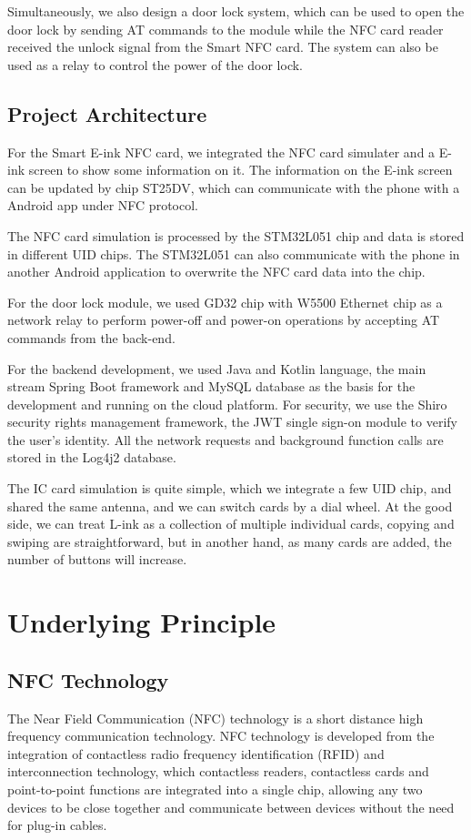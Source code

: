 \documentclass[11pt, a4paper]{article}
\begin{document}
Simultaneously, we also design a door lock system, which can be used to open the door lock by sending AT commands to the module while the NFC card reader received the unlock signal from the Smart NFC card.
The system can also be used as a relay to control the power of the door lock.

\subsection{Project Architecture}

For the Smart E-ink NFC card, we integrated the NFC card simulater and a E-ink screen to show some information on it. The information on the E-ink screen can be updated by chip ST25DV, which can communicate with the phone with a Android app under NFC protocol.

The NFC card simulation is processed by the STM32L051 chip and data is stored in different UID chips. The STM32L051 can also communicate with the phone in another Android application to overwrite the NFC card data into the chip.

For the door lock module, we used GD32 chip with W5500 Ethernet chip as a network relay to perform power-off and power-on operations by accepting AT commands from the back-end.

For the backend development, we used Java and Kotlin language, the main stream Spring Boot framework and MySQL database as the basis for the development and running on the cloud platform.
For security, we use the Shiro security rights management framework, the JWT single sign-on module to verify the user's identity.
All the network requests and background function calls are stored in the Log4j2 database.

The IC card simulation is quite simple, which we integrate a few UID chip, and shared the same antenna, and we can switch cards by a dial wheel. At the good side, we can treat L-ink as a collection of multiple individual cards, copying and swiping are straightforward, but in another hand, as many cards are added, the number of buttons will increase.


\section{Underlying Principle}

\subsection{NFC Technology}
The Near Field Communication (NFC) technology is a short distance high frequency communication technology. NFC technology is developed from the integration of contactless radio frequency identification (RFID) and interconnection technology, which contactless readers, contactless cards and point-to-point functions are integrated into a single chip, allowing any two devices to be close together and communicate between devices without the need for plug-in cables.
\end{document}
